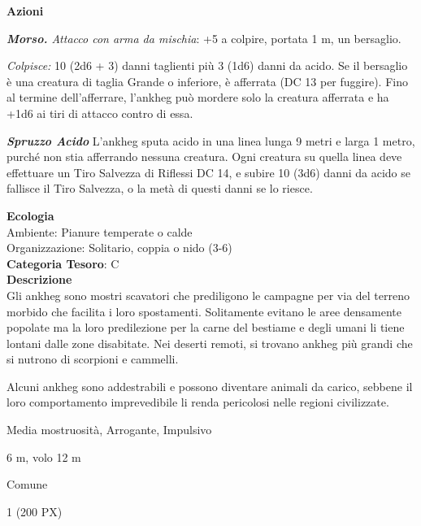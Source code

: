 \begin{multicols}{2}
{\textbf{Azioni}

\emph{\textbf{Morso.} Attacco con arma da mischia}: +5 a colpire, portata 1 m, un bersaglio.

\emph{Colpisce:} 10 (2d6 + 3) danni taglienti più 3 (1d6) danni da acido. Se il bersaglio è una creatura di taglia Grande o inferiore, è afferrata (DC 13 per fuggire). Fino al termine dell'afferrare, l'ankheg può mordere solo la creatura afferrata e ha +1d6 ai tiri di attacco contro di essa.

\emph{\textbf{Spruzzo Acido}} L'ankheg sputa acido in una linea lunga 9 metri e larga 1 metro, purché non stia afferrando nessuna creatura. Ogni creatura su quella linea deve effettuare un Tiro Salvezza di Riflessi DC 14, e subire 10 (3d6) danni da acido se fallisce il Tiro Salvezza, o la metà di questi danni se lo riesce.

\textbf{Ecologia}\\
Ambiente: Pianure temperate o calde\\
Organizzazione: Solitario, coppia o nido (3-6)\\
\textbf{Categoria Tesoro}: C\\
\textbf{Descrizione}\\
Gli ankheg sono mostri scavatori che prediligono le campagne per via del terreno morbido che facilita i loro spostamenti. Solitamente evitano le aree densamente popolate ma la loro predilezione per la carne del bestiame e degli umani li tiene lontani dalle zone disabitate. Nei deserti remoti, si trovano ankheg più grandi che si nutrono di scorpioni e cammelli.

Alcuni ankheg sono addestrabili e possono diventare animali da carico, sebbene il loro comportamento imprevedibile li renda pericolosi nelle regioni civilizzate.

\begin{description}[noitemsep, topsep=0pt, parsep=0pt, partopsep=0pt, itemsep=1pt, leftmargin=2.35cm,  labelwidth=2.2cm, itemindent=0cm, listparindent=0pt] %
\setlength{\baselineskip}{10pt}
\item[\textbf{Taglia/Tipo}] Media mostruosità, Arrogante, Impulsivo
\item[\textbf{Caratt.}] 
\item[\textbf{Punti Ferita}] 
\item[\textbf{Movimento}] 6 m, volo 12 m
\item[\textbf{Tiri Salvez.}] 
\item[\textbf{Linguaggi}] Comune
\item[\textbf{Sfida}] 1 (200 PX)
\end{description}
\smallskip

}
\end{multicols}
